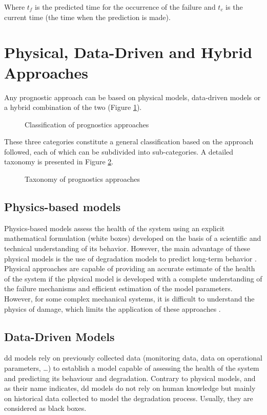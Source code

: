Where $t_f$ is the predicted time for the occurrence of the failure and $t_c$ is the current time (the time when the prediction is made).

\section{Physical, Data-Driven and Hybrid Approaches}
\label{section:prognostics-approaches}
Any prognostic approach can be based on physical models, data-driven models or a hybrid combination of the two (Figure \ref{fig:prognostic-approaches-venn}).

\begin{figure}[ht]
    \centering
	
    \caption{Classification of prognostics approaches}
    \label{fig:prognostic-approaches-venn}
\end{figure}

These three categories constitute a general classification based on the approach followed, each of which can be subdivided into sub-categories. A detailed taxonomy is presented in Figure \ref{fig:prognostic-approaches-tree}.

\begin{figure}[ht]
	\resizebox{\textwidth}{!}{}
    \caption{Taxonomy of prognostics approaches \cite{Javed2017}}
    \label{fig:prognostic-approaches-tree}
\end{figure}


\subsection{Physics-based models}
Physics-based models assess the health of the system using an explicit mathematical formulation (white boxes) developed on the basis of a scientific and technical understanding of its behavior. However, the main advantage of these physical models is the use of degradation models to predict long-term behavior \cite{Cubillo2016}. Physical approaches are capable of providing an accurate estimate of the health of the system if the physical model is developed with a complete understanding of the failure mechanisms and efficient estimation of the model parameters. However, for some complex mechanical systems, it is difficult to understand the physics of damage, which limits the application of these approaches \cite{Lei2018}.

\subsection{Data-Driven Models}
\acrlong{dd}  models rely on previously collected data (monitoring data, data on operational parameters, …) to establish a model capable of assessing the health of the system and predicting its behaviour and degradation. Contrary to physical models, and as their name indicates, \acrlong{dd} models do not rely on human knowledge but mainly on historical data collected to model the degradation process. Usually, they are considered as black boxes.

